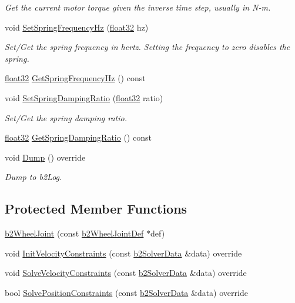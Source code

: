 \begin{DoxyCompactItemize}
\begin{DoxyCompactList}\small\item\em Get the current motor torque given the inverse time step, usually in N-\/m. \end{DoxyCompactList}\item 
void \mbox{\hyperlink{classb2_wheel_joint_af9f8fada5cb30f83aa2fbf486e9d347b}{Set\+Spring\+Frequency\+Hz}} (\mbox{\hyperlink{b2_settings_8h_aacdc525d6f7bddb3ae95d5c311bd06a1}{float32}} hz)
\begin{DoxyCompactList}\small\item\em Set/\+Get the spring frequency in hertz. Setting the frequency to zero disables the spring. \end{DoxyCompactList}\item 
\mbox{\hyperlink{b2_settings_8h_aacdc525d6f7bddb3ae95d5c311bd06a1}{float32}} \mbox{\hyperlink{classb2_wheel_joint_a3a22add79f238b4243407956b031c9f4}{Get\+Spring\+Frequency\+Hz}} () const
\item 
void \mbox{\hyperlink{classb2_wheel_joint_a39b123ac045c8ec93faa65746e6655dc}{Set\+Spring\+Damping\+Ratio}} (\mbox{\hyperlink{b2_settings_8h_aacdc525d6f7bddb3ae95d5c311bd06a1}{float32}} ratio)
\begin{DoxyCompactList}\small\item\em Set/\+Get the spring damping ratio. \end{DoxyCompactList}\item 
\mbox{\hyperlink{b2_settings_8h_aacdc525d6f7bddb3ae95d5c311bd06a1}{float32}} \mbox{\hyperlink{classb2_wheel_joint_a18726ad5af314531f518132d6623bc61}{Get\+Spring\+Damping\+Ratio}} () const
\item 
void \mbox{\hyperlink{classb2_wheel_joint_a8295644bd733c28c8c9fa6390a367f3f}{Dump}} () override
\begin{DoxyCompactList}\small\item\em Dump to b2\+Log. \end{DoxyCompactList}\end{DoxyCompactItemize}
\subsection*{Protected Member Functions}
\begin{DoxyCompactItemize}
\item 
\mbox{\hyperlink{classb2_wheel_joint_a9c8bbb1068ddb46d074fe91802dd6a39}{b2\+Wheel\+Joint}} (const \mbox{\hyperlink{structb2_wheel_joint_def}{b2\+Wheel\+Joint\+Def}} $\ast$def)
\item 
void \mbox{\hyperlink{classb2_wheel_joint_a557c58a58cdf75d5b2c14c7f75a37575}{Init\+Velocity\+Constraints}} (const \mbox{\hyperlink{structb2_solver_data}{b2\+Solver\+Data}} \&data) override
\item 
void \mbox{\hyperlink{classb2_wheel_joint_afbda202bc67d58cac38e3c5b138b93f7}{Solve\+Velocity\+Constraints}} (const \mbox{\hyperlink{structb2_solver_data}{b2\+Solver\+Data}} \&data) override
\item 
bool \mbox{\hyperlink{classb2_wheel_joint_addbe70ee831954312bc31dee1d52311f}{Solve\+Position\+Constraints}} (const \mbox{\hyperlink{structb2_solver_data}{b2\+Solver\+Data}} \&data) override
\end{DoxyCompactItemize}
